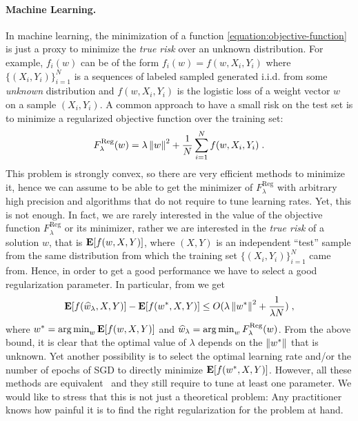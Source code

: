 \paragraph{Machine Learning.} In machine learning, the minimization of a function
\eqref{equation:objective-function} is just a proxy to minimize the \emph{true
risk} over an unknown distribution. For example, $f_i(w)$ can be of the form
$f_i(w) = f(w, X_i, Y_i)$ where $\{(X_i, Y_i)\}_{i=1}^N$ is a sequences of
labeled sampled generated i.i.d. from some \emph{unknown} distribution and
$f(w, X_i, Y_i)$ is the logistic loss of a weight vector $w$ on a sample $(X_i,
Y_i)$.  A common approach to have a small risk on the test set is to minimize a
regularized objective function over the training set:
%
\begin{equation}
\label{equation:reg_logloss}
F_\lambda^{\text{Reg}}(w) = \lambda \left\|{w}\right\|^2 + \frac{1}{N} \sum_{i=1}^N f(w, X_i, Y_i) \; .
\end{equation}
%
This problem is strongly convex, so there are very efficient methods to
minimize it, hence we can assume to be able to get the minimizer of
$F_\lambda^{\text{Reg}}$ with arbitrary high precision and algorithms that do
not require to tune learning rates. Yet, this is not enough. In fact, we are
rarely interested in the value of the objective function
$F_\lambda^{\text{Reg}}$ or its minimizer, rather we are interested in the
\emph{true risk} of a solution $w$, that is $\operatorname*{\mathbf{E}}[f(w,X,Y)]$, where $(X,Y)$ is
an independent ``test'' sample from the same distribution from which the
training set $\{(X_i,Y_i)\}_{i=1}^N$ came from. Hence, in order to get a good
performance we have to select a good regularization parameter. In particular,
from \cite{Sridharan-Shalev-Shwartz-Srebro-2009} we get
\[
\operatorname*{\mathbf{E}}[f(\widehat{w}_\lambda,X,Y)] - \operatorname*{\mathbf{E}}[f(w^*,X,Y)] \le O(\lambda \left\|{w^*}\right\|^2 + \frac{1}{\lambda N}) \; ,
\]
where $w^*=\operatorname*{arg\,min}_w \operatorname*{\mathbf{E}}[f(w,X,Y)]$ and $\widehat{w}_\lambda = \operatorname*{arg\,min}_w
F_\lambda^{\text{Reg}}(w)$.  From the above bound, it is clear that the optimal
value of $\lambda$ depends on the $\left\|{w^*}\right\|$ that is unknown.  Yet another
possibility is to select the optimal learning rate and/or the number of epochs
of \ac{SGD} to directly minimize $\operatorname*{\mathbf{E}}[f(w^*,X,Y)]$. However, all these methods
are equivalent~\citep{Lin-Camoriano-Rosasco-2016} and they still require to
tune at least one parameter.
We would like to stress that this is not just a theoretical problem: Any
practitioner knows how painful it is to find the right regularization for the
problem at hand.

